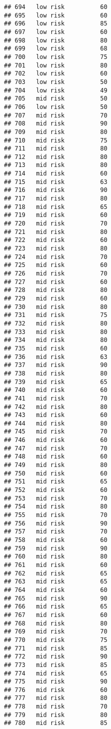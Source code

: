 \documentclass[
  ignorenonframetext,
]{beamer}
\begin{document}
\begin{frame}[fragile]
\begin{verbatim}
## 694   low risk          60
## 695   low risk          60
## 696   low risk          85
## 697   low risk          60
## 698   low risk          80
## 699   low risk          68
## 700   low risk          75
## 701   low risk          80
## 702   low risk          60
## 703   low risk          50
## 704   low risk          49
## 705   mid risk          50
## 706   low risk          50
## 707   mid risk          70
## 708   mid risk          90
## 709   mid risk          80
## 710   mid risk          75
## 711   mid risk          80
## 712   mid risk          80
## 713   mid risk          80
## 714   mid risk          60
## 715   mid risk          63
## 716   mid risk          90
## 717   mid risk          80
## 718   mid risk          65
## 719   mid risk          60
## 720   mid risk          70
## 721   mid risk          80
## 722   mid risk          60
## 723   mid risk          80
## 724   mid risk          70
## 725   mid risk          60
## 726   mid risk          70
## 727   mid risk          60
## 728   mid risk          80
## 729   mid risk          60
## 730   mid risk          80
## 731   mid risk          75
## 732   mid risk          80
## 733   mid risk          80
## 734   mid risk          80
## 735   mid risk          60
## 736   mid risk          63
## 737   mid risk          90
## 738   mid risk          80
## 739   mid risk          65
## 740   mid risk          60
## 741   mid risk          70
## 742   mid risk          80
## 743   mid risk          60
## 744   mid risk          80
## 745   mid risk          70
## 746   mid risk          60
## 747   mid risk          70
## 748   mid risk          60
## 749   mid risk          80
## 750   mid risk          60
## 751   mid risk          65
## 752   mid risk          60
## 753   mid risk          70
## 754   mid risk          80
## 755   mid risk          70
## 756   mid risk          90
## 757   mid risk          70
## 758   mid risk          60
## 759   mid risk          90
## 760   mid risk          80
## 761   mid risk          60
## 762   mid risk          65
## 763   mid risk          65
## 764   mid risk          60
## 765   mid risk          90
## 766   mid risk          65
## 767   mid risk          60
## 768   mid risk          80
## 769   mid risk          70
## 770   mid risk          75
## 771   mid risk          85
## 772   mid risk          90
## 773   mid risk          85
## 774   mid risk          65
## 775   mid risk          90
## 776   mid risk          60
## 777   mid risk          80
## 778   mid risk          70
## 779   mid risk          80
## 780   mid risk          85

\end{verbatim}
\end{frame}
\end{document}
